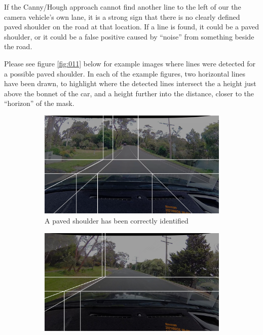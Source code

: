 \documentclass[11pt,twoside]{report}
\begin{document}
If the Canny/Hough approach cannot find another line to the left of our the camera vehicle's own lane, it is a strong sign that there is no clearly defined paved shoulder on the road at that location.  If a line is found, it could be a paved shoulder, or it could be a false positive caused by ``noise'' from something beside the road.

Please see figure \ref{fig:011} below for example images where lines were detected for a possible paved shoulder.  In each of the example figures, two horizontal lines have been drawn, to highlight where the detected lines intersect the a height just above the bonnet of the car, and a height further into the distance, closer to the ``horizon'' of the mask.

\begin{figure}[h]
\centering
\begin{subfigure}{0.3\textwidth}
	\includegraphics[width=\textwidth]{f011_true.png}
	\caption{A paved shoulder has been correctly identified}
	\label{fig:011a}
\end{subfigure}
\hfill
\begin{subfigure}{0.3\textwidth}
	\includegraphics[width=\textwidth]{f011_false_gutter.png}

\end{subfigure}
\end{figure}
\end{document}
